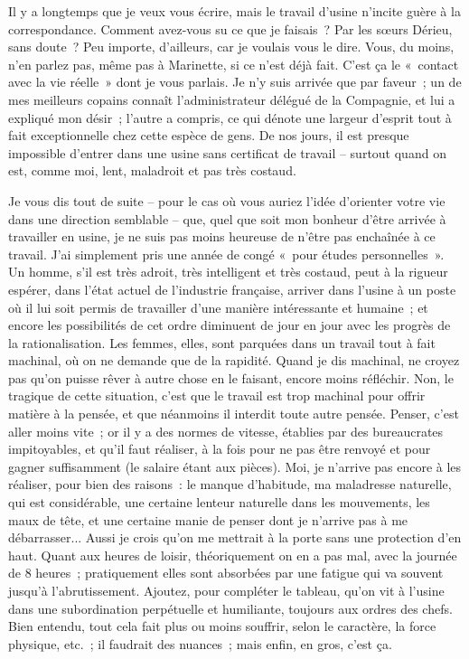 \documentclass[french,twoside]{book} %
\newcommand{\salute}[1]{\bigbreak{#1}\par\medbreak}
\begin{document}
\salute{Chère petite,}
\noindent Il y a longtemps que je veux vous écrire, mais le travail d'usine n'incite guère à la correspondance. Comment avez-vous su ce que je faisais ? Par les sœurs Dérieu, sans doute ? Peu importe, d'ailleurs, car je voulais vous le dire. Vous, du moins, n'en parlez pas, même pas à Marinette, si ce n'est déjà fait. C'est ça le « contact avec la vie réelle » dont je vous parlais. Je n'y suis arrivée que par faveur ; un de mes meilleurs copains connaît l'administrateur délégué de la Compagnie, et lui a expliqué mon désir ; l'autre a compris, ce qui dénote une largeur d'esprit tout à fait exceptionnelle chez cette espèce de gens. De nos jours, il est presque impossible d'entrer dans une usine sans certificat de travail – surtout quand on est, comme moi, lent, maladroit et pas très costaud.\par
Je vous dis tout de suite – pour le cas où vous auriez l'idée d'orienter votre vie dans une direction semblable – que, quel que soit mon bonheur d'être arrivée à travailler en usine, je ne suis pas moins heureuse de n'être pas enchaînée à ce travail. J'ai simplement pris une année de congé « pour études personnelles ». Un homme, s'il est très adroit, très intelligent et très costaud, peut à la rigueur espérer, dans l'état actuel de l'industrie française, arriver dans l'usine à un poste où il lui soit permis de travailler d'une manière intéressante et humaine ; et encore les possibilités de cet ordre diminuent de jour en jour avec les progrès de la rationalisation. Les femmes, elles, sont parquées dans un travail tout à fait machinal, où on ne demande que de la rapidité. Quand je dis machinal, ne croyez pas qu'on puisse rêver à autre chose en le faisant, encore moins réfléchir. Non, le tragique de cette situation, c'est que le travail est trop machinal pour offrir matière à la pensée, et que néanmoins il interdit toute autre pensée. Penser, c'est aller moins vite ; or il y a des normes de vitesse, établies par des bureaucrates impitoyables, et qu'il faut réaliser, à la fois pour ne pas être renvoyé et pour gagner suffisamment (le salaire étant aux pièces). Moi, je n'arrive pas encore à les réaliser, pour bien des raisons : le manque d'habitude, ma maladresse naturelle, qui est considérable, une certaine lenteur naturelle dans les mouvements, les maux de tête, et une certaine manie de penser dont je n'arrive pas à me débarrasser... Aussi je crois qu'on me mettrait à la porte sans une protection d'en haut. Quant aux heures de loisir, théoriquement on en a pas mal, avec la journée de 8 heures ; pratiquement elles sont absorbées par une fatigue qui va souvent jusqu'à l'abrutissement. Ajoutez, pour compléter le tableau, qu'on vit à l'usine dans une subordination perpétuelle et humiliante, toujours aux ordres des chefs. Bien entendu, tout cela fait plus ou moins souffrir, selon le caractère, la force physique, etc. ; il faudrait des nuances ; mais enfin, en gros, c'est ça.\par
\end{document}
